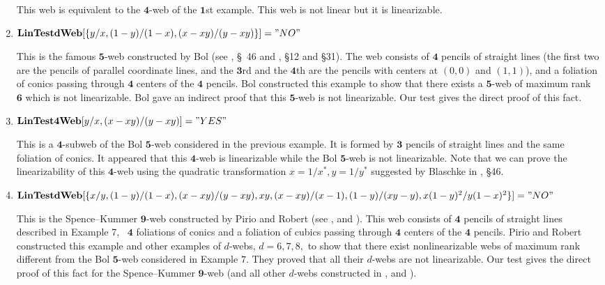 \documentclass{article}
\begin{document}
\begin{enumerate}
This web is equivalent to the $\mathbf{4}$-web of the $\mathbf{1}$st
example. This web is not linear but it is linearizable.

\item $\mathbf{LinTestdWeb}[\{y/x,(1-y)/(1-x),(x-xy)/(y-xy)\}]="NO"$

This is the famous $\mathbf{5}$-web constructed by Bol (see \cite{B 55}, \S\
46 and \cite{BB 38}, \S 12 and \S 31). The web consists of $\mathbf{4}$
pencils of straight lines (the first two are the pencils of parallel
coordinate lines, and the $\mathbf{3}$rd and the $\mathbf{4}$th are the
pencils with centers at $(0,0)$ and $(1,1)$), and a foliation of conics
passing through $\mathbf{4}$ centers of the $\mathbf{4}$ pencils. Bol
constructed this example to show that there exists a $\mathbf{5}$-web of
maximum rank $\mathbf{6}$ which is not linearizable. Bol gave an indirect
proof that this $\mathbf{5}$-web is not linearizable. Our test gives the
direct proof of this fact.

\item $\mathbf{LinTest4Web}[y/x,(x-xy)/(y-xy)]="YES"$

This is a $\mathbf{4}$-subweb of the Bol $\mathbf{5}$-web considered in the
previous example. It is formed by $\mathbf{3}$ pencils of straight lines and
the same foliation of conics. It appeared that this $\mathbf{4}$-web is
linearizable while the Bol $\mathbf{5}$-web is not linearizable. Note that
we can prove the linearizability of this $\mathbf{4}$-web using the
quadratic transformation $x=1/x^{\ast },y=1/y^{\ast }$ suggested by Blaschke
in \cite{B 55}, \S 46.

\item $\mathbf{LinTestdWeb}%
[\{x/y,(1-y)/(1-x),(x-xy)/(y-xy),xy,(x-xy)/(x-1),(1-y)/(xy-y),x(1-y)^{2}/y(1-x)^{2}\}]="NO"
$

This is the Spence--Kummer $\mathbf{9}$-web constructed by Pirio and Robert
(see \cite{P 02a}, \cite{P 02b} and \cite{R 02}). This web consists of $%
\mathbf{4}$ pencils of straight lines described in Example 7, \ $\mathbf{4}$
foliations of conics and a foliation of cubics passing through $\mathbf{4}$
centers of the $\mathbf{4}$ pencils. Pirio and Robert constructed this
example and other examples of $d$-webs, $d=6,7,8,$ to show that there exist
nonlinearizable webs of maximum rank different from the Bol $\mathbf{5}$-web
considered in Example $7$. They proved that all their $d$-webs are not
linearizable. Our test gives the direct proof of this fact for the
Spence--Kummer $\mathbf{9}$-web (and all other $d$-webs constructed in \cite%
{P 02a}, \cite{P 02b} and \cite{R 02}).
\end{enumerate}
\end{document}
